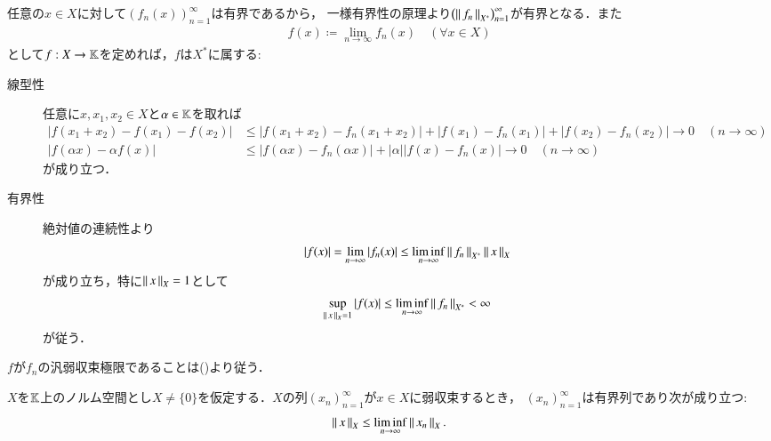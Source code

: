 	\begin{prf}
		任意の$x \in X$に対して$\left( f_n(x) \right)_{n=1}^{\infty}$は有界であるから，
		一様有界性の原理より$\left( \left\|\, f_n\, \right\|_{X^*} \right)_{n=1}^{\infty}$が有界となる．また
		\begin{align}
			f(x) \coloneqq \lim_{n \to \infty} f_n(x) \quad (\forall x \in X)
			\label{eq:thm_weak_star_convergence_bonded}
		\end{align}
		として$f:X \rightarrow \mathbb{K}$を定めれば，$f$は$X^*$に属する:
		\begin{description}
			\item[線型性]
				任意に$x,x_1,x_2 \in X$と$\alpha \in \mathbb{K}$を取れば
				\begin{align}
					\left| f(x_1 + x_2) - f(x_1) - f(x_2) \right| &\leq \left| f(x_1 + x_2) - f_n (x_1 + x_2)\right| + \left| f(x_1) - f_n(x_1) \right| 
						+ \left| f(x_2) - f_n(x_2) \right| \longrightarrow 0 \quad (n \longrightarrow \infty) \\
					\left| f(\alpha x) - \alpha f(x) \right| &\leq \left| f(\alpha x) - f_n(\alpha x) \right| + |\alpha| \left| f(x) - f_n(x) \right|
						\longrightarrow 0 \quad (n \longrightarrow \infty)
				\end{align}
				が成り立つ．
			
			\item[有界性]
				絶対値の連続性より
				\begin{align}
					\left| f(x) \right| = \lim_{n \to \infty} \left| f_n(x) \right| \leq \liminf_{n \to \infty} \left\|\, f_n\, \right\|_{X^*} \left\|\, x\, \right\|_{X}
				\end{align}
				が成り立ち，特に$\left\|\, x\, \right\|_{X} = 1$として
				\begin{align}
					\operatorname*{sup}_{\left\|\, x\, \right\|_{X} = 1} \left| f(x) \right| \leq \liminf_{n \to \infty} \left\|\, f_n\, \right\|_{X^*} < \infty
				\end{align}
				が従う．
		\end{description}
		$f$が$f_n$の汎弱収束極限であることは()より従う．
		\QED
	\end{prf}
	
	\begin{screen}
		\begin{thm}[弱収束列の有界性]
			$X$を$\mathbb{K}$上のノルム空間とし$X \neq \{0\}$を仮定する．$X$の列$(x_n)_{n=1}^{\infty}$が$x \in X$に弱収束するとき，
			$(x_n)_{n=1}^{\infty}$は有界列であり次が成り立つ:
			\begin{align}
				\left\|\, x\, \right\|_{X} \leq \liminf_{n \to \infty} \left\|\, x_n\, \right\|_{X}.
			\end{align}
			\label{thm:weak_convergence_bounded}
		\end{thm}
	\end{screen}
	
